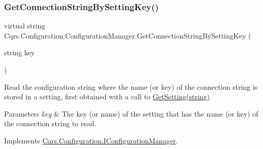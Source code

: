 \mbox{\label{classCqrs_1_1Configuration_1_1ConfigurationManager_accd6e8fbb5566f00d356c7fa6c6fdb98_accd6e8fbb5566f00d356c7fa6c6fdb98}} 
\subsubsection{\texorpdfstring{Get\+Connection\+String\+By\+Setting\+Key()}{GetConnectionStringBySettingKey()}}
{\footnotesize\ttfamily virtual string Cqrs.\+Configuration.\+Configuration\+Manager.\+Get\+Connection\+String\+By\+Setting\+Key (\begin{DoxyParamCaption}\item[{string}]{key }\end{DoxyParamCaption})\hspace{0.3cm}{\ttfamily [virtual]}}



Read the configuration string where the name (or key) of the connection string is stored in a setting, first obtained with a call to \hyperlink{classCqrs_1_1Configuration_1_1ConfigurationManager_ac3e31af665b95b781fee23f577170a63_ac3e31af665b95b781fee23f577170a63}{Get\+Setting(string)} 


\begin{DoxyParams}{Parameters}
{\em key} & The key (or name) of the setting that has the name (or key) of the connection string to read.\\
\hline
\end{DoxyParams}


Implements \hyperlink{interfaceCqrs_1_1Configuration_1_1IConfigurationManager_a39de4f0a619d943c44b63b2a9b98e983_a39de4f0a619d943c44b63b2a9b98e983}{Cqrs.\+Configuration.\+I\+Configuration\+Manager}.

\mbox{\label{classCqrs_1_1Configuration_1_1ConfigurationManager_ac3e31af665b95b781fee23f577170a63_ac3e31af665b95b781fee23f577170a63}} 
